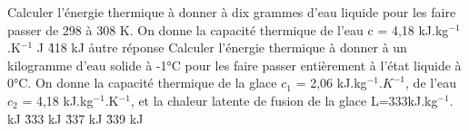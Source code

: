 \q
Calculer l'énergie thermique à donner à dix grammes d'eau liquide pour les faire passer de 298 à 308 K. On donne la capacité thermique de l'eau c = 4,18 kJ.kg$^{-1}$.K$^{-1}$
 J
\r
418 kJ
\r
autre réponse
\q
Calculer l'énergie thermique à donner à un kilogramme d'eau solide à -1°C pour les faire passer entièrement à l'état liquide à 0°C. On donne la capacité thermique de la glace $c_1$ = 2,06 kJ.kg$^{-1}.K^{-1}$, de l'eau $c_2$ = 4,18 kJ.kg$^{-1}$.K$^{-1}$, et la chaleur latente de fusion de la glace L=333kJ.kg$^{-1}$.
 kJ
\r
333 kJ
\r
337 kJ
\r
339 kJ


